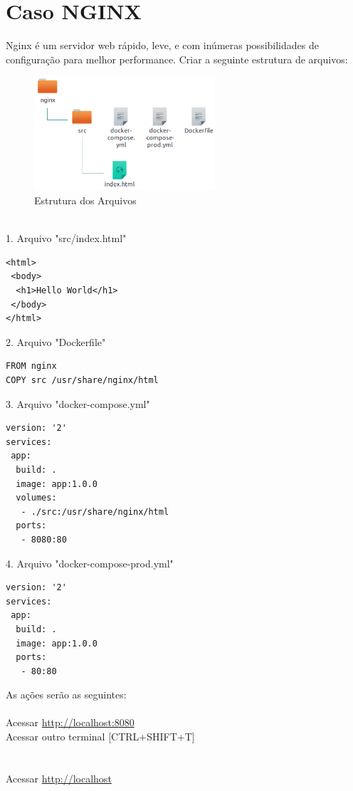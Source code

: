 \documentclass[a4paper,11pt]{article}
\begin{document}
\section{Caso NGINX}
Nginx é um servidor web rápido, leve, e com inúmeras possibilidades de configuração para melhor performance. Criar a seguinte estrutura de arquivos:
\begin{figure}[!htb]
	\centering
	\includegraphics[width=0.6\textwidth]{imagem/estnginx.png}
	\caption{Estrutura dos Arquivos}
\end{figure} \\
1. Arquivo "src/index.html"
\begin{lstlisting}[]
<html>
 <body>
  <h1>Hello World</h1>
 </body>
</html>
\end{lstlisting}
2. Arquivo "Dockerfile"
\begin{lstlisting}[]
FROM nginx
COPY src /usr/share/nginx/html
\end{lstlisting}
3. Arquivo "docker-compose.yml"
\begin{lstlisting}[]
version: '2'
services:
 app:
  build: .
  image: app:1.0.0
  volumes:
   - ./src:/usr/share/nginx/html
  ports:
   - 8080:80 
\end{lstlisting}
4. Arquivo "docker-compose-prod.yml"
\begin{lstlisting}[]
version: '2'
services:
 app:
  build: .
  image: app:1.0.0
  ports:
   - 80:80 
\end{lstlisting}
As ações serão as seguintes: \\
 \\
Acessar \url{http://localhost:8080} \\
Acessar outro terminal [CTRL+SHIFT+T] \\
 \\
 \\
Acessar \url{http://localhost} \\
\end{document}
